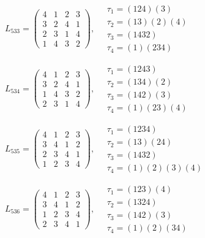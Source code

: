 $L_{533} = \begin{pmatrix} 4 & 1 & 2 & 3 \\ 3 & 2 & 4 & 1 \\ 2 & 3 & 1 & 4 \\ 1 & 4 & 3 & 2 \end{pmatrix}, \quad \begin{matrix} \tau_{1} = (1 2 4)(3) \\ \tau_{2} = (1 3)(2)(4) \\ \tau_{3} = (1 4 3 2) \\ \tau_{4} = (1)(2 3 4) \end{matrix}$

$L_{534} = \begin{pmatrix} 4 & 1 & 2 & 3 \\ 3 & 2 & 4 & 1 \\ 1 & 4 & 3 & 2 \\ 2 & 3 & 1 & 4 \end{pmatrix}, \quad \begin{matrix} \tau_{1} = (1 2 4 3) \\ \tau_{2} = (1 3 4)(2) \\ \tau_{3} = (1 4 2)(3) \\ \tau_{4} = (1)(2 3)(4) \end{matrix}$

$L_{535} = \begin{pmatrix} 4 & 1 & 2 & 3 \\ 3 & 4 & 1 & 2 \\ 2 & 3 & 4 & 1 \\ 1 & 2 & 3 & 4 \end{pmatrix}, \quad \begin{matrix} \tau_{1} = (1 2 3 4) \\ \tau_{2} = (1 3)(2 4) \\ \tau_{3} = (1 4 3 2) \\ \tau_{4} = (1)(2)(3)(4) \end{matrix}$

$L_{536} = \begin{pmatrix} 4 & 1 & 2 & 3 \\ 3 & 4 & 1 & 2 \\ 1 & 2 & 3 & 4 \\ 2 & 3 & 4 & 1 \end{pmatrix}, \quad \begin{matrix} \tau_{1} = (1 2 3)(4) \\ \tau_{2} = (1 3 2 4) \\ \tau_{3} = (1 4 2)(3) \\ \tau_{4} = (1)(2)(3 4) \end{matrix}$

